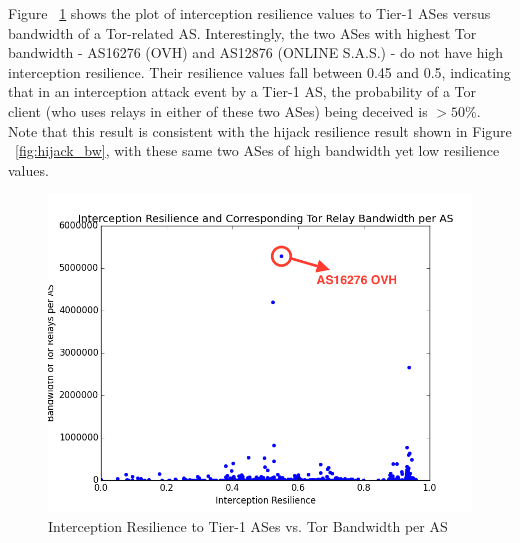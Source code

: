 Figure ~\ref{fig:interception_bw} shows the plot of interception resilience values to Tier-1 ASes versus bandwidth of a Tor-related AS. Interestingly, the two ASes with highest Tor bandwidth - AS16276 (OVH) and AS12876 (ONLINE S.A.S.) - do not have high interception resilience. Their resilience values fall between 0.45 and 0.5, indicating that in an interception attack event by a Tier-1 AS, the probability of a Tor client (who uses relays in either of these two ASes) being deceived is $> 50\%$. Note that this result is consistent with the hijack resilience result shown in Figure ~\ref{fig:hijack_bw}, with these same two ASes of high bandwidth yet low resilience values. 

\begin{figure}[ht!]
\centering
\includegraphics[width=.4\textwidth]{figure/interception_bandwidth}
\caption{Interception Resilience to Tier-1 ASes vs. Tor Bandwidth per AS}
\label{fig:interception_bw}
\end{figure}



